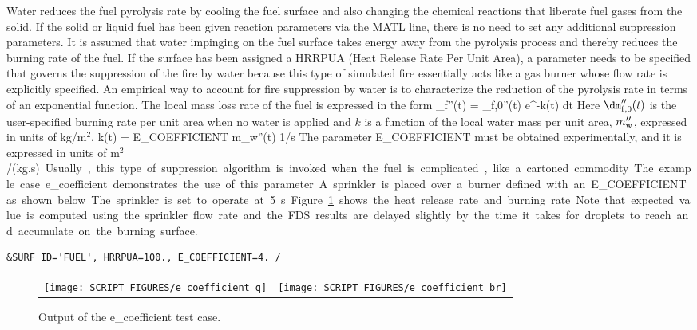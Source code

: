 \documentclass[11pt]{book}
\begin{document}
Water reduces the fuel pyrolysis rate by cooling the fuel surface and also changing the chemical reactions that liberate fuel gases from the solid. If the solid or liquid fuel has been given reaction parameters via the {\ct MATL} line, there is no need to set any additional suppression parameters. It is assumed that water impinging on the fuel surface takes energy away from the pyrolysis process and thereby reduces the burning rate of the fuel. If the surface has been assigned a {\ct HRRPUA} (Heat Release Rate Per Unit Area), a parameter needs to be specified that governs the suppression of the fire by water because this type of simulated fire essentially acts like a gas burner whose flow rate is explicitly specified. An empirical way to account for fire suppression by water is to characterize the reduction of the pyrolysis rate in terms of an exponential function. The local mass loss rate of the fuel is expressed in the form
\be
   \dm_{\rm f}''(t) = \dm_{\rm f,0}''(t) \; {\rm e}^{-\int k(t) \; dt} \label{nistexting}
\ee
Here $\dm_{\rm f,0}''(t)$ is the user-specified burning rate per unit area when no water is applied and $k$ is a function of the local water mass per unit area, $m_{\rm w}''$, expressed in units of kg/m$^2$.
\be
k(t) = \hbox{\ct E\_COEFFICIENT} \; m_{\rm w}''(t) \quad          \si{1/s}
\ee
The parameter {\ct E\_COEFFICIENT} must be obtained experimentally, and it is expressed in units of \si{m$^2$/(kg.s)}. Usually, this type of suppression algorithm is invoked when the fuel is complicated, like a cartoned commodity.  The example case {\ct e\_coefficient} demonstrates the use of this parameter.  A sprinkler is placed over a burner defined with an {\ct E\_COEFFICIENT} as shown below.  The sprinkler is set to operate at 5~s.  Figure~\ref{e_coef_fig} shows the heat release rate and burning rate. Note that expected value is computed using the sprinkler flow rate and the FDS results are delayed slightly by the time it takes for droplets to reach and accumulate on the burning surface.
\begin{lstlisting}
&SURF ID='FUEL', HRRPUA=100., E_COEFFICIENT=4. /
\end{lstlisting}

\begin{figure}[ht]
\begin{tabular*}{\textwidth}{lr}
\texttt{[image: SCRIPT\_FIGURES/e\_coefficient\_q]} &
\texttt{[image: SCRIPT\_FIGURES/e\_coefficient\_br]}
\end{tabular*}
\caption[Results of the {\ct e\_coefficient} test case]{Output of the  {\ct e\_coefficient} test case.}
\label{e_coef_fig}
\end{figure}
\end{document}
